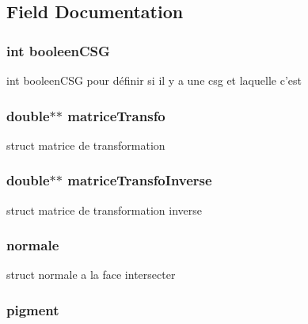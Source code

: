 \subsection{Field Documentation}
\hypertarget{structtorus_a4428e32d4383f7dee25e5a4cb192da24}{
\subsubsection[{booleenCSG}]{\setlength{\rightskip}{0pt plus 5cm}int {\bf booleenCSG}}}
\label{structtorus_a4428e32d4383f7dee25e5a4cb192da24}
int booleenCSG pour définir si il y a une csg et laquelle c'est \hypertarget{structtorus_aa06ccc348007e3355beccf412f2f656c}{
\subsubsection[{matriceTransfo}]{\setlength{\rightskip}{0pt plus 5cm}double$\ast$$\ast$ {\bf matriceTransfo}}}
\label{structtorus_aa06ccc348007e3355beccf412f2f656c}
struct matrice de transformation \hypertarget{structtorus_acd7a3590501dcccfaefccbb658f83821}{
\subsubsection[{matriceTransfoInverse}]{\setlength{\rightskip}{0pt plus 5cm}double$\ast$$\ast$ {\bf matriceTransfoInverse}}}
\label{structtorus_acd7a3590501dcccfaefccbb658f83821}
struct matrice de transformation inverse \hypertarget{structtorus_a944738f40a0294270a0047acc5a77ee2}{
\subsubsection[{normale}]{ {\bf normale}}}
\label{structtorus_a944738f40a0294270a0047acc5a77ee2}
struct normale a la face intersecter \hypertarget{structtorus_a5a4ee24431a1811fa1c8b75844198987}{
\subsubsection[{pigment}]{ {\bf pigment}}}
